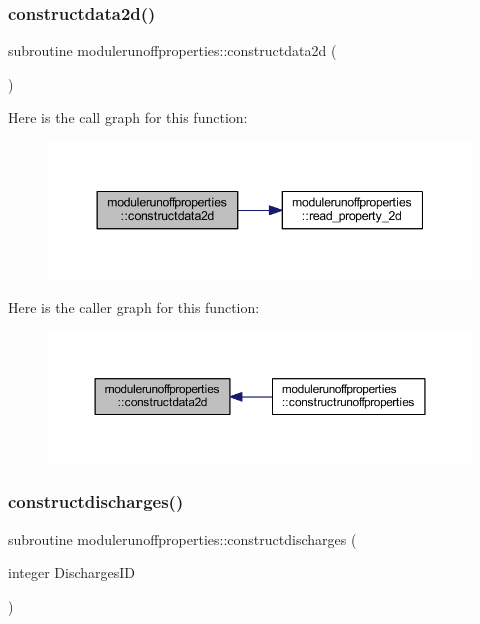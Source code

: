 \subsubsection{\texorpdfstring{constructdata2d()}{constructdata2d()}}
{\footnotesize\ttfamily subroutine modulerunoffproperties\+::constructdata2d (\begin{DoxyParamCaption}{ }\end{DoxyParamCaption})\hspace{0.3cm}{\ttfamily [private]}}

Here is the call graph for this function\+:\nopagebreak
\begin{figure}[H]
\begin{center}
\leavevmode
\includegraphics[width=344pt]{namespacemodulerunoffproperties_a3a9583323dea60d8001dd48bf958642e_cgraph}
\end{center}
\end{figure}
Here is the caller graph for this function\+:\nopagebreak
\begin{figure}[H]
\begin{center}
\leavevmode
\includegraphics[width=350pt]{namespacemodulerunoffproperties_a3a9583323dea60d8001dd48bf958642e_icgraph}
\end{center}
\end{figure}
\mbox{\label{namespacemodulerunoffproperties_af8a32b20348bababc5852a1a5ce34acc}} 
\subsubsection{\texorpdfstring{constructdischarges()}{constructdischarges()}}
{\footnotesize\ttfamily subroutine modulerunoffproperties\+::constructdischarges (\begin{DoxyParamCaption}\item[{integer}]{Discharges\+ID }\end{DoxyParamCaption})\hspace{0.3cm}{\ttfamily [private]}}

